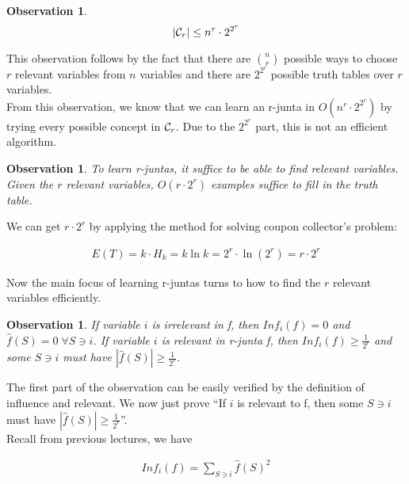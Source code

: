 \documentclass[12pt]{article}
\newtheorem{observation}[theorem]{Observation}
\newcommand{\calc}{{\cal C}}
\begin{document}
\begin{observation}
\begin{equation*}
|\calc_r| \le n^r \cdot 2^{2^r}
\end{equation*}
\end{observation}

This observation follows by the fact that there are $\binom {n}{r}$
possible ways to choose $r$ relevant variables from $n$ variables and
there are $2^{2^r}$ possible truth tables over $r$ variables. \\

From this observation, we know that we can learn an r-junta in $O(n^r
\cdot 2^{2^r})$ by trying every possible concept in $\calc_r$. Due
to the $2^{2^r}$ part, this is not an efficient algorithm.

\begin{observation}
To learn r-juntas, it suffice to be able to find relevant
variables. Given the $r$ relevant variables, $O(r \cdot 2^r)$ examples
suffice to fill in the truth table.
\end{observation}

We can get $r \cdot 2^r$ by applying the method for solving coupon
collector's problem:

\begin{eqnarray*}
E(T) = k \cdot H_k = k \ln k = 2^r \cdot \ln (2^r) = r \cdot 2^r
\end{eqnarray*}

Now the main focus of learning r-juntas turns to how to find the $r$
relevant variables efficiently.

\begin{observation}
If variable $i$ is irrelevant in f, then $Inf_i(f) = 0$ and $\hat
{f}(S) = 0 \; \forall S \ni i$. If variable $i$ is relevant in r-junta
f, then $Inf_i(f) \ge \frac {1}{2^r}$ and some $S \ni i$ must have
$|\hat {f}(S)| \ge \frac {1}{2^r}$.
\end{observation}

The first part of the observation can be easily verified by the
definition of influence and relevant. We now just prove ``If $i$ is
relevant to f, then some $S \ni i$ must have $|\hat {f}(S)| \ge \frac
{1}{2^r}$''. \\

Recall from previous lectures, we have

\begin{eqnarray*}
Inf_i(f) = \sum_{S \ni i} \hat {f}(S)^2
\end{eqnarray*}
\end{document}
